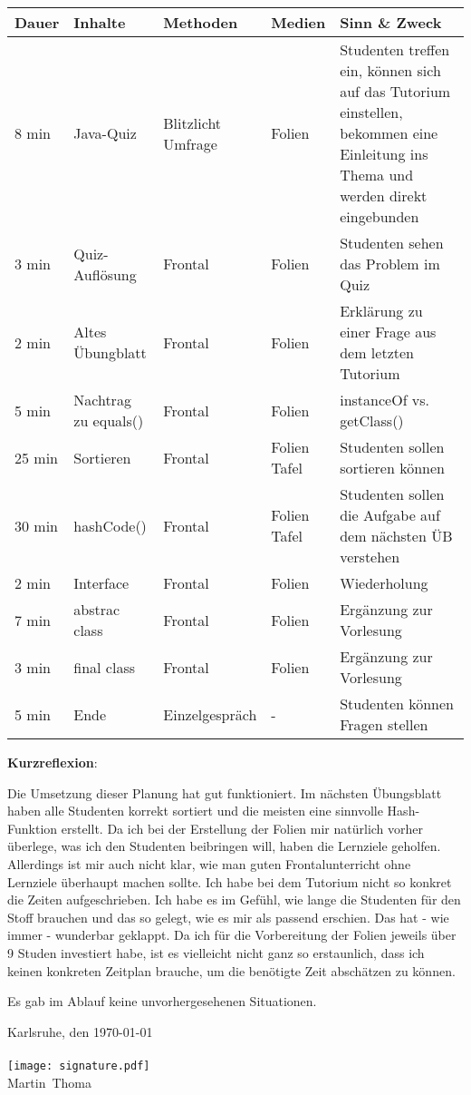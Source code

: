 \documentclass[a4paper,12pt]{article}
\newcommand{\Datum}{\today}             %
\newcommand{\Ort}{Karlsruhe}
\newcommand{\Vorname}{Martin}
\newcommand{\Nachname}{Thoma}
\begin{document}
\begin{tabularx}{\textwidth}{@{}llllX}
Dauer   & Inhalte        & Methoden            & Medien  & Sinn \& Zweck\\
\hline
8 min   & Java-Quiz      & \parbox[t]{2cm}{Blitzlicht\\Umfrage} & Folien  & Studenten treffen ein, können sich auf das Tutorium einstellen, bekommen eine Einleitung ins Thema und werden direkt eingebunden\\
3 min   & Quiz-Auflösung & Frontal  & Folien    & Studenten sehen das Problem im Quiz\\
2 min   & Altes Übungblatt & Frontal& Folien    & Erklärung zu einer Frage aus dem letzten Tutorium\\
5 min   & Nachtrag zu equals() &Frontal & Folien& instanceOf vs. getClass()\\
25 min  & Sortieren      & Frontal  & \parbox[t]{2cm}{Folien\\Tafel}    & Studenten sollen sortieren können\\
30 min  & hashCode()     & Frontal  & \parbox[t]{2cm}{Folien\\Tafel}    & Studenten sollen die Aufgabe auf dem nächsten ÜB verstehen\\
 2 min  & Interface      & Frontal  & Folien    & Wiederholung\\
 7 min  & abstrac class  & Frontal  & Folien    & Ergänzung zur Vorlesung\\
 3 min  & final class    & Frontal  & Folien    & Ergänzung zur Vorlesung\\
 5 min  & Ende           & Einzelgespräch  & -  & Studenten können Fragen stellen\\
\end{tabularx}

\textbf{Kurzreflexion}:

Die Umsetzung dieser Planung hat gut funktioniert. Im nächsten 
Übungsblatt haben alle Studenten korrekt sortiert und die meisten
eine sinnvolle Hash-Funktion erstellt. Da ich bei der Erstellung der
Folien mir natürlich vorher überlege, was ich den Studenten beibringen
will, haben die Lernziele geholfen. Allerdings ist mir auch
nicht klar, wie man guten Frontalunterricht ohne Lernziele überhaupt
machen sollte.
Ich habe bei dem Tutorium nicht so konkret die Zeiten aufgeschrieben.
Ich habe es im Gefühl, wie lange die Studenten für den Stoff brauchen
und das so gelegt, wie es mir als passend erschien. Das hat - wie immer -
wunderbar geklappt. Da ich für die Vorbereitung der Folien jeweils 
über 9 Studen investiert habe, ist es vielleicht nicht ganz so erstaunlich,
dass ich keinen konkreten Zeitplan brauche, um die benötigte Zeit 
abschätzen zu können.

Es gab im Ablauf keine unvorhergesehenen Situationen.

\noindent \Ort, den \Datum\\
\\
\texttt{[image: signature.pdf]}\\
\Vorname~\Nachname
\end{document}
